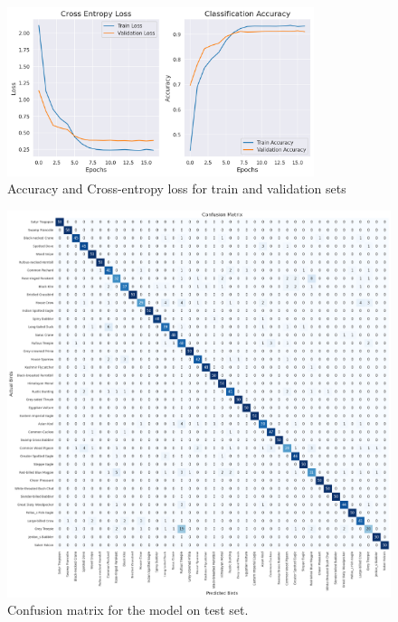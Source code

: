 \begin{figure}[h!]
    \centering
    \includegraphics[width=0.8\textwidth]{images/accuracy_and_loss.png}
    \caption{Accuracy and Cross-entropy loss for train and validation sets}
    \label{fig:visualization}
\end{figure}

\begin{figure}[h!]
    \centering
    \includegraphics[scale=0.3]{images/confusion_matrix.png}
    \caption{Confusion matrix for the model on test set.}
    \label{fig:Confusion matrix}
\end{figure}

